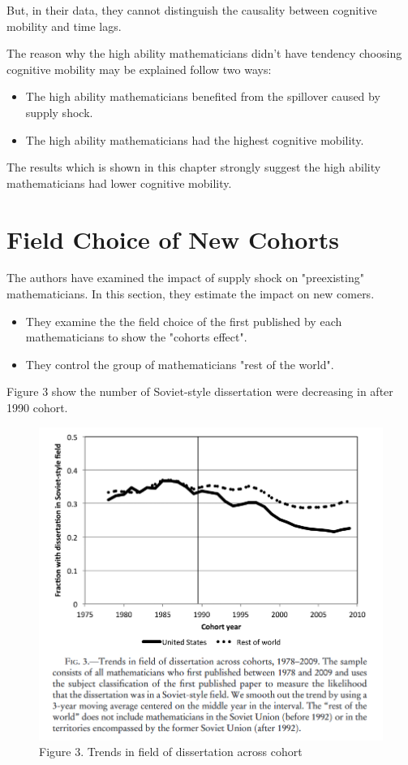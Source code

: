 \documentclass[../root]{subfiles}
\begin{document}
    But, in their data, they cannot distinguish the causality between cognitive mobility and time lags.
    
    The reason why the high ability mathematicians didn't have tendency choosing cognitive mobility may be explained follow two ways:
    \begin{itemize}
        \item The high ability mathematicians benefited from the spillover caused by supply shock.
        \item The high ability mathematicians had the highest cognitive mobility.
    \end{itemize}
    
    The results which is shown in this chapter strongly suggest the high ability mathematicians had lower cognitive mobility.
    
    \section{Field Choice of New Cohorts}
    The authors have examined the impact of supply shock on "preexisting" mathematicians. In this section, they estimate the impact on new comers.
    
    \begin{itemize}
        \item They examine the the field choice of the first published by each mathematicians to show the "cohorts effect".
        \item They control the group of mathematicians "rest of the world".
    \end{itemize}
    
    Figure 3 show the number of Soviet-style dissertation were decreasing in after 1990 cohort. 
    \begin{figure}
        \centering
        \includegraphics[width = \linewidth]{_images/0918sugiyama/Figure_3.png}
        \caption{Figure 3. Trends in field of dissertation across cohort}
        \label{fig:my_label}
    \end{figure}
    
\end{document}
